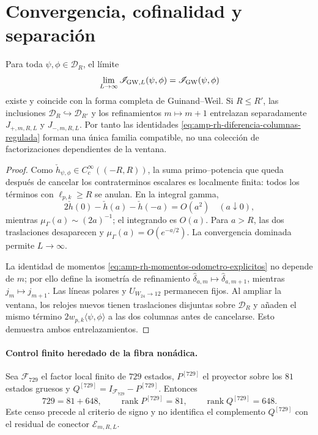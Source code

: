 \section*{Convergencia, cofinalidad y separación}

\begin{proposition}
\label{prop:amp-rh-convergencia-cofinal}
Para toda \(\psi,\phi\in\mathcal D_R\), el límite
\[
 \lim_{L\to\infty}\mathscr I_{{\rm GW},L}(\psi,\phi)
 =\mathscr I_{\rm GW}(\psi,\phi)
\]
existe y coincide con la forma completa de Guinand--Weil. Si
\(R\leq R'\), las inclusiones
\(\mathcal D_R\hookrightarrow\mathcal D_{R'}\) y los refinamientos
\(m\mapsto m+1\) entrelazan separadamente
\(J_{+,m,R,L}\) y \(J_{-,m,R,L}\).
Por tanto las identidades
\eqref{eq:amp-rh-diferencia-columnas-regulada} forman una única familia
compatible, no una colección de factorizaciones dependientes de la
ventana.
\end{proposition}

\begin{proof}
Como \(\check h_{\psi,\phi}\in C_c^\infty((-R,R))\), la suma primo--potencia
que queda después de cancelar los contraterminos escalares es localmente
finita: todos los términos con \(\ell_{p,k}\geq R\) se anulan. En la
integral gamma,
\[
 2\check h(0)-\check h(a)-\check h(-a)=O(a^2)
 \quad(a\downarrow0),
\]
mientras \(\mu_\Gamma(a)\sim(2a)^{-1}\); el integrando es \(O(a)\).
Para \(a>R\), las dos traslaciones desaparecen y
\(\mu_\Gamma(a)=O(e^{-a/2})\). La convergencia dominada permite
\(L\to\infty\).

La identidad de momentos
\eqref{eq:amp-rh-momentos-odometro-explicitos} no depende de \(m\);
por ello define la isometría de refinamiento
\(\widehat\delta_{a,m}\mapsto\widehat\delta_{a,m+1}\), mientras
\(j_m\mapsto j_{m+1}\). Las líneas polares y
\(U_{W_{24}\to12}\) permanecen fijos. Al ampliar la ventana, los relojes
nuevos tienen traslaciones disjuntas sobre \(\mathcal D_R\) y añaden el
mismo término \(2w_{p,k}\langle\psi,\phi\rangle\) a las dos columnas antes
de cancelarse. Esto demuestra ambos entrelazamientos.
\end{proof}

\paragraph{Control finito heredado de la fibra nonádica.}
Sea \(\mathscr F_{729}\) el factor local finito de \(729\) estados,
\(P^{[729]}\) el proyector sobre los \(81\) estados gruesos y
\(Q^{[729]}=I_{\mathscr F_{729}}-P^{[729]}\). Entonces
\begin{equation}\label{eq:amp-rh-729-81-648}
 729=81+648,\qquad
 \operatorname{rank}P^{[729]}=81,\qquad
 \operatorname{rank}Q^{[729]}=648.
\end{equation}
Este censo precede al criterio de signo y no identifica el complemento
\(Q^{[729]}\) con el residual de conector
\(\mathcal E_{m,R,L}\).

